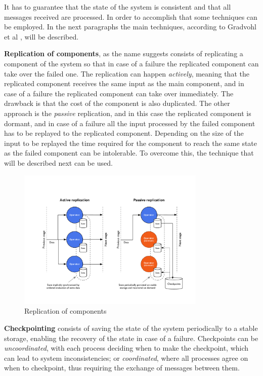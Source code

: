 \documentclass[ppgc,diss,english]{iiufrgs}
\begin{document}
It has to guarantee that the state of the system is consistent and that all messages received are processed. In order to accomplish that some techniques can be employed. In the next paragraphs the main techniques, according to Gradvohl et al \cite{gradvohl2014comparing}, will be described.

\textbf{Replication of components}, as the name suggests consists of replicating a component of the system so that in case of a failure the replicated component can take over the failed one. The replication can happen \emph{actively}, meaning that the replicated component receives the same input as the main component, and in case of a failure the replicated component can take over immediately. The drawback is that the cost of the component is also duplicated. The other approach is the \emph{passive} replication, and in this case the replicated component is dormant, and in case of a failure all the input processed by the failed component has to be replayed to the replicated component. Depending on the size of the input to be replayed the time required for the component to reach the same state as the failed component can be intolerable. To overcome this, the technique that will be described next can be used.

\begin{figure}[!ht]
	\centering
	\includegraphics[width=0.8\textwidth]{images/fault_tolerance/replication.pdf}
	\caption[Replication of components]{Replication of components \cite{heinze2014cloud}}
	\label{fig:ft_replication}
\end{figure}

\textbf{Checkpointing} consists of saving the state of the system periodically to a stable storage, enabling the recovery of the state in case of a failure. Checkpoints can be \emph{uncoordinated}, with each process deciding when to make the checkpoint, which can lead to system inconsistencies; or \emph{coordinated}, where all processes agree on when to checkpoint, thus requiring the exchange of messages between them.
\end{document}
